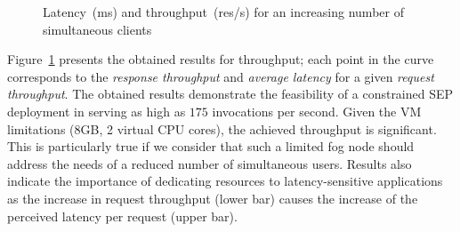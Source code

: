 \begin{figure}[tbh]
\centering
{}
\caption{Latency~(ms) and throughput~(res/s) for an increasing number of simultaneous clients}
\label{fig:RESULTS_THROUGHPUT}
\end{figure}

Figure~\ref{fig:RESULTS_THROUGHPUT} presents the obtained results for throughput; each point in the curve corresponds to the \textit{response throughput} and \textit{average latency} for a given \textit{request throughput}. 
%
The obtained results demonstrate the feasibility of a constrained SEP deployment in serving as high as $175$ invocations per second. Given the VM limitations (8GB, 2 virtual CPU cores), the achieved throughput is significant. This is particularly true if we consider that such a limited fog node should address the needs of a reduced number of simultaneous users. Results also indicate the importance of dedicating resources to latency-sensitive applications as the increase in request throughput (lower bar) causes the increase of the perceived latency per request (upper bar). 



